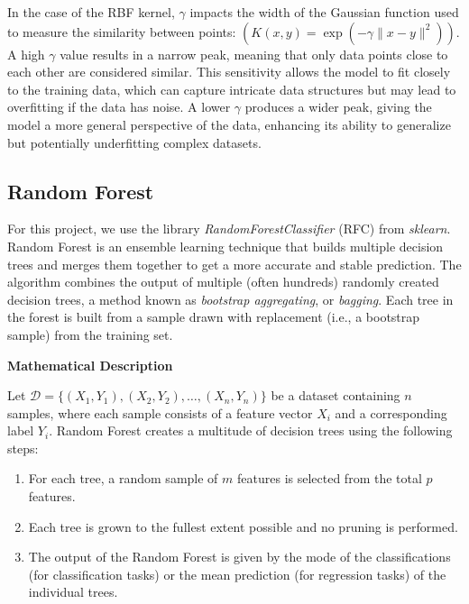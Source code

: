 \documentclass[twocolumn]{article}
\begin{document}
In the case of the RBF kernel, $\gamma$ impacts the width of the Gaussian function used to measure the similarity between points: $(K(x, y) = \exp(-\gamma \| x - y \|^2))$. A high $\gamma$ value results in a narrow peak, meaning that only data points close to each other are considered similar. This sensitivity allows the model to fit closely to the training data, which can capture intricate data structures but may lead to overfitting if the data has noise. A lower $\gamma$ produces a wider peak, giving the model a more general perspective of the data, enhancing its ability to generalize but potentially underfitting complex datasets.


\begin{comment}
\textbf{Kernel Function}\\
Common choices for the kernel function \(K\) include:
- Polynomial: \(K(\mathbf{x}_i, \mathbf{x}_j) = (\gamma \mathbf{x}_i^T \mathbf{x}_j + r)^d\),
- Radial Basis Function (RBF): \(K(\mathbf{x}_i, \mathbf{x}_j) = \exp(-\gamma \|\mathbf{x}_i - \mathbf{x}_j\|^2)\),
- Sigmoid: \(K(\mathbf{x}_i, \mathbf{x}_j) = \tanh(\gamma \mathbf{x}_i^T \mathbf{x}_j + r)\).
\(\gamma\), \(r\), and \(d\) are parameters that can be tuned according to the specific data and problem requirements.  
\end{comment}

\subsection{Random Forest}
For this project, we use the library \textit{RandomForestClassifier} (RFC) from \textit{sklearn}.
Random Forest is an ensemble learning technique that builds multiple decision trees and merges them together to get a more accurate and stable prediction. The algorithm combines the output of multiple (often hundreds) randomly created decision trees, a method known as \textit{bootstrap aggregating}, or \textit{bagging}. Each tree in the forest is built from a sample drawn with replacement (i.e., a bootstrap sample) from the training set.

\textbf{\large Mathematical Description}

Let \( \mathcal{D} = \{(X_1, Y_1), (X_2, Y_2), \dots, (X_n, Y_n)\} \) be a dataset containing \( n \) samples, where each sample consists of a feature vector \( X_i \) and a corresponding label \( Y_i \). Random Forest creates a multitude of decision trees using the following steps:

\begin{enumerate}
    \item For each tree, a random sample of \( m \) features is selected from the total \( p \) features.
    \item Each tree is grown to the fullest extent possible and no pruning is performed.
    \item The output of the Random Forest is given by the mode of the classifications (for classification tasks) or the mean prediction (for regression tasks) of the individual trees.
\end{enumerate}
\end{document}
